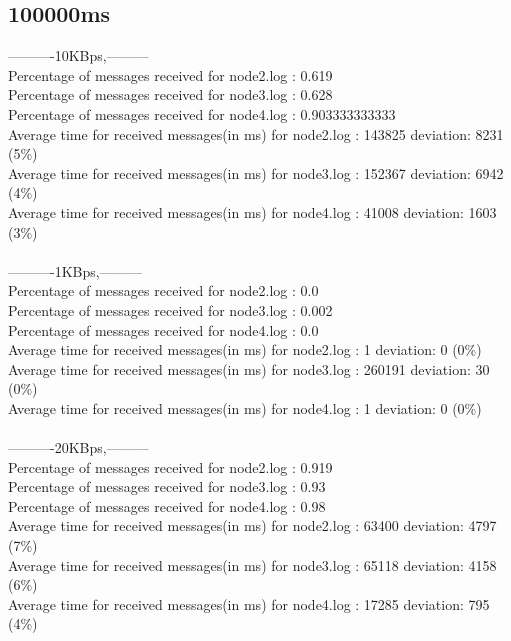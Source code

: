     \subsection{100000ms}\label{RawResults:100000ms}
        ----------10KBps,---------\\
        Percentage of messages received for node2.log : 0.619\\
        Percentage of messages received for node3.log : 0.628\\
        Percentage of messages received for node4.log : 0.903333333333\\
        Average time for received messages(in ms) for  node2.log : 143825   deviation: 8231 (5\%)\\
        Average time for received messages(in ms) for  node3.log : 152367   deviation: 6942 (4\%)\\
        Average time for received messages(in ms) for  node4.log : 41008    deviation: 1603 (3\%)\\\\
        ----------1KBps,---------\\
        Percentage of messages received for node2.log : 0.0\\
        Percentage of messages received for node3.log : 0.002\\
        Percentage of messages received for node4.log : 0.0\\
        Average time for received messages(in ms) for  node2.log : 1    deviation: 0 (0\%)\\
        Average time for received messages(in ms) for  node3.log : 260191   deviation: 30 (0\%)\\
        Average time for received messages(in ms) for  node4.log : 1    deviation: 0 (0\%)\\\\
        ----------20KBps,---------\\
        Percentage of messages received for node2.log : 0.919\\
        Percentage of messages received for node3.log : 0.93\\
        Percentage of messages received for node4.log : 0.98\\
        Average time for received messages(in ms) for  node2.log : 63400    deviation: 4797 (7\%)\\
        Average time for received messages(in ms) for  node3.log : 65118    deviation: 4158 (6\%)\\
        Average time for received messages(in ms) for  node4.log : 17285    deviation: 795 (4\%)\\\\
